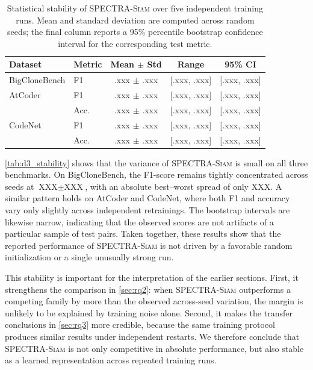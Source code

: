 \documentclass[final,5p,times,twocolumn]{elsarticle}
\newcommand{\method}{\textsc{SPECTRA-Siam}}
\theoremstyle{plain}
\begin{document}
\begin{table}[!htbp]
\centering
\caption{Statistical stability of \method{} over five independent training runs.
Mean and standard deviation are computed across random seeds; the final column
reports a 95\% percentile bootstrap confidence interval for the corresponding
test metric.}
\label{tab:d3_stability}

\scriptsize
\setlength{\tabcolsep}{4.2pt}
\renewcommand{\arraystretch}{1.08}

\begin{tabular}{@{}llccc@{}}
\toprule
\textbf{Dataset}
& \textbf{Metric}
& \textbf{Mean $\pm$ Std}
& \textbf{Range}
& \textbf{95\% CI} \\
\midrule

BigCloneBench
& F1
& .xxx $\pm$ .xxx
& [.xxx, .xxx]
& [.xxx, .xxx] \\

\midrule

AtCoder
& F1
& .xxx $\pm$ .xxx
& [.xxx, .xxx]
& [.xxx, .xxx] \\

& Acc.
& .xxx $\pm$ .xxx
& [.xxx, .xxx]
& [.xxx, .xxx] \\

\midrule

CodeNet
& F1
& .xxx $\pm$ .xxx
& [.xxx, .xxx]
& [.xxx, .xxx] \\

& Acc.
& .xxx $\pm$ .xxx
& [.xxx, .xxx]
& [.xxx, .xxx] \\

\bottomrule
\end{tabular}
\end{table}

\autoref{tab:d3_stability} shows that the variance of \method{} is small on all three benchmarks. On BigCloneBench, the F1-score remains tightly concentrated across seeds at
$\text{XXX}\pm\text{XXX}$,
with an absolute best--worst spread of only
$\text{XXX}$.
A similar pattern holds on AtCoder and CodeNet, where both F1 and accuracy vary only slightly across independent retrainings. The bootstrap intervals are likewise narrow, indicating that the observed scores are not artifacts of a particular sample of test pairs. Taken together, these results show that the reported performance of \method{} is not driven by a favorable random initialization or a single unusually strong run.

This stability is important for the interpretation of the earlier sections. First, it strengthens the comparison in \autoref{sec:rq2}: when \method{} outperforms a competing family by more than the observed across-seed variation, the margin is unlikely to be explained by training noise alone. Second, it makes the transfer conclusions in \autoref{sec:rq3} more credible, because the same training protocol produces similar results under independent restarts. We therefore conclude that \method{} is not only competitive in absolute performance, but also stable as a learned representation across repeated training runs.
\end{document}
